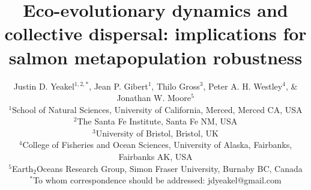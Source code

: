 \documentclass{revtex4}
\begin{document}
\title{Eco-evolutionary dynamics and collective dispersal: implications for salmon metapopulation robustness}
\author{
Justin D. Yeakel${}^{1,2,*}$, Jean P. Gibert${}^{1}$, Thilo Gross${}^3$, Peter A. H. Westley${}^{4}$, \& Jonathan W. Moore${}^{5}$ \\
${}^1$School of Natural Sciences, University of California, Merced, Merced CA, USA \\
${}^2$The Santa Fe Institute, Santa Fe NM, USA \\
${}^3$University of Bristol, Bristol, UK\\
${}^4$College of Fisheries and Ocean Sciences, University of Alaska, Fairbanks, Fairbanks AK, USA \\
${}^5$Earth${}_2$Oceans Research Group, Simon Fraser University, Burnaby BC, Canada \\
${}^*$To whom correspondence should be addressed: jdyeakel@gmail.com
}
\end{document}
